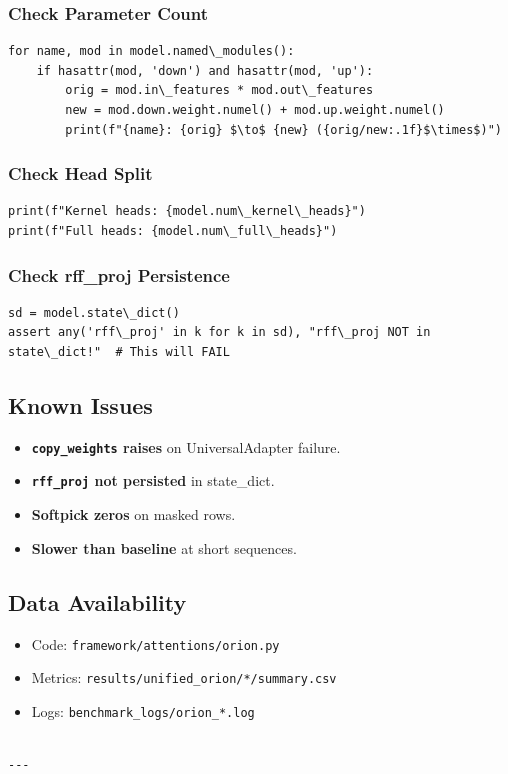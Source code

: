 \subsubsection{Check Parameter Count}

\begin{lstlisting}
for name, mod in model.named\_modules():
    if hasattr(mod, 'down') and hasattr(mod, 'up'):
        orig = mod.in\_features * mod.out\_features
        new = mod.down.weight.numel() + mod.up.weight.numel()
        print(f"{name}: {orig} $\to$ {new} ({orig/new:.1f}$\times$)")
\end{lstlisting}

\subsubsection{Check Head Split}

\begin{lstlisting}
print(f"Kernel heads: {model.num\_kernel\_heads}")
print(f"Full heads: {model.num\_full\_heads}")
\end{lstlisting}

\subsubsection{Check rff\_proj Persistence}

\begin{lstlisting}
sd = model.state\_dict()
assert any('rff\_proj' in k for k in sd), "rff\_proj NOT in state\_dict!"  # This will FAIL
\end{lstlisting}

\subsection{Known Issues}

\begin{itemize}
\item \textbf{\texttt{copy\_weights} raises} on UniversalAdapter failure.
\item \textbf{\texttt{rff\_proj} not persisted} in state\_dict.
\item \textbf{Softpick zeros} on masked rows.
\item \textbf{Slower than baseline} at short sequences.

\end{itemize}
\subsection{Data Availability}

\begin{itemize}
\item Code: \texttt{framework/attentions/orion.py}
\item Metrics: \texttt{results/unified\_orion/*/summary.csv}
\item Logs: \texttt{benchmark\_logs/orion\_*.log}
\end{itemize}
\begin{lstlisting}

---
\end{lstlisting}
